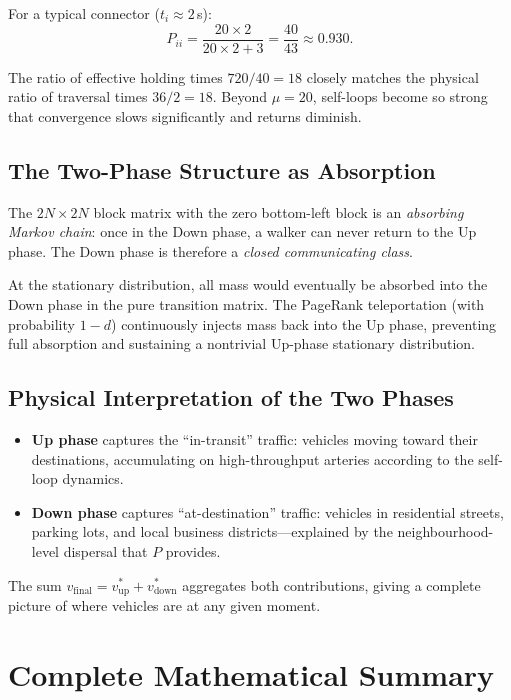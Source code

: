\documentclass[12pt,a4paper]{article}
\theoremstyle{definition}
\theoremstyle{plain}
\newcommand{\vup}{v_{\mathrm{up}}}
\newcommand{\vdown}{v_{\mathrm{down}}}
\newcommand{\vf}{v_{\mathrm{final}}}
\begin{document}
For a typical connector ($t_i \approx 2$\,s):
\begin{equation}
  P_{ii} = \frac{20 \times 2}{20 \times 2 + 3} = \frac{40}{43} \approx 0.930.
\end{equation}

The ratio of effective holding times $720 / 40 = 18$ closely matches the physical ratio
of traversal times $36 / 2 = 18$. Beyond $\mu=20$, self-loops become so strong that
convergence slows significantly and returns diminish.

\subsection{The Two-Phase Structure as Absorption}

The $2N \times 2N$ block matrix with the zero bottom-left block is an \emph{absorbing
Markov chain}: once in the Down phase, a walker can never return to the Up phase. The
Down phase is therefore a \emph{closed communicating class}.

At the stationary distribution, all mass would eventually be absorbed into the Down phase
in the pure transition matrix. The PageRank teleportation (with probability $1-d$)
continuously injects mass back into the Up phase, preventing full absorption and
sustaining a nontrivial Up-phase stationary distribution.

\subsection{Physical Interpretation of the Two Phases}

\begin{itemize}
  \item \textbf{Up phase} captures the ``in-transit'' traffic: vehicles moving toward
    their destinations, accumulating on high-throughput arteries according to the
    self-loop dynamics.
  \item \textbf{Down phase} captures ``at-destination'' traffic: vehicles in residential
    streets, parking lots, and local business districts---explained by the
    neighbourhood-level dispersal that $P$ provides.
\end{itemize}

The sum $\vf = \vup^* + \vdown^*$ aggregates both contributions, giving a complete
picture of where vehicles are at any given moment.

\section{Complete Mathematical Summary}
\end{document}
